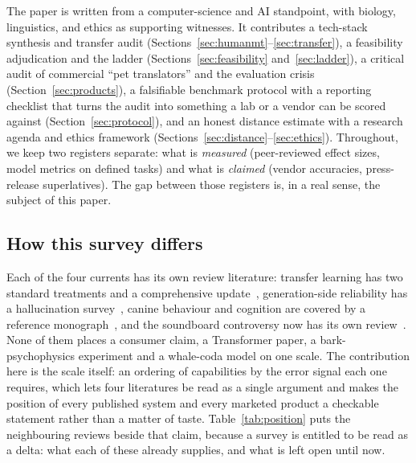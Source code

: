 The paper is written from a computer-science and AI standpoint, with
biology, linguistics, and ethics as supporting witnesses. It contributes a
tech-stack synthesis and transfer audit
(Sections~\ref{sec:humanmt}--\ref{sec:transfer}), a feasibility adjudication
and the ladder (Sections~\ref{sec:feasibility} and~\ref{sec:ladder}), a
critical audit of commercial ``pet translators'' and the evaluation crisis
(Section~\ref{sec:products}), a falsifiable benchmark protocol with a reporting
checklist that turns the audit into something a lab or a vendor can be scored
against (Section~\ref{sec:protocol}), and an honest distance estimate with a
research agenda and ethics framework
(Sections~\ref{sec:distance}--\ref{sec:ethics}). Throughout, we keep two
registers separate: what is \emph{measured} (peer-reviewed effect sizes,
model metrics on defined tasks) and what is \emph{claimed} (vendor
accuracies, press-release superlatives). The gap between those registers
is, in a real sense, the subject of this paper.

\subsection{How this survey differs}
Each of the four currents has its own review literature: transfer learning has
two standard treatments and a comprehensive update~\cite{pan2010transfer,zhuang2021transfer},
generation-side reliability has a hallucination survey~\cite{ji2023hallucination},
canine behaviour and cognition are covered by a reference
monograph~\cite{miklosi2007dog}, and the soundboard controversy now has its own
review~\cite{animalcog2025review}. None of them places a consumer claim, a
Transformer paper, a bark-psychophysics experiment and a whale-coda model on
one scale. The contribution here is the scale itself: an ordering of
capabilities by the error signal each one requires, which lets four literatures
be read as a single argument and makes the position of every published system
and every marketed product a checkable statement rather than a matter of taste.
Table~\ref{tab:position} puts the neighbouring reviews beside that claim,
because a survey is entitled to be read as a delta: what each of these already
supplies, and what is left open until now.

